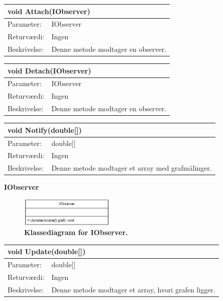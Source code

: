 \begin{table}[H]
\label{tab:tabel2}
\begin{tabular}{| l | p{13cm} |}
   \hline
   \multicolumn{2}{|l|}{void Attach(IObserver)} \\ \hline
   Parameter: & IObserver\\ \hline
   Returværdi: & Ingen \\ \hline
   Beskrivelse: & Denne metode modtager en observer.\\ \hline
\end{tabular}
\end{table}
\begin{table}[H]
\label{tab:tabel2}
\begin{tabular}{| l | p{13cm} |}
   \hline
   \multicolumn{2}{|l|}{void Detach(IObserver)} \\ \hline
   Parameter: & IObserver\\ \hline
   Returværdi: & Ingen \\ \hline
   Beskrivelse: & Denne metode modtager en observer.\\ \hline
\end{tabular}
\end{table}
\begin{table}[H]
\label{tab:tabel2}
\begin{tabular}{| l | p{13cm} |}
   \hline
   \multicolumn{2}{|l|}{void Notify(double[])} \\ \hline
   Parameter: & double[]\\ \hline
   Returværdi: & Ingen \\ \hline
   Beskrivelse: & Denne metode modtager et array med grafmålinger.\\ \hline
\end{tabular}
\end{table}
\textbf{IObserver}
\begin{figure}[H]
\includegraphics[width =0.4\textwidth , center]{billeder/klassediagramIobserver}
\caption{\textbf{Klassediagram for IObserver.}}
\end{figure}
\begin{table}[H]
\label{tab:tabel2}
\begin{tabular}{| l | p{13cm} |}
   \hline
   \multicolumn{2}{|l|}{void Update(double[])} \\ \hline
   Parameter: & double[]\\ \hline
   Returværdi: & Ingen \\ \hline
   Beskrivelse: & Denne metode modtager et array, hvori grafen ligger.\\ \hline
\end{tabular}
\end{table}
